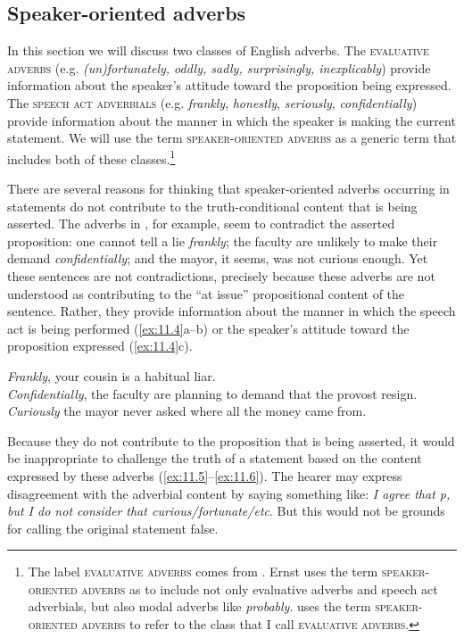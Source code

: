 \subsection{Speaker-oriented adverbs}\label{sec:11.2.2}

In this section we will discuss two classes of English adverbs. The \textsc{evaluative adverbs (}e.g. \textit{(un)fortunately, oddly, sadly, surprisingly, inexplicably}) provide information about the speaker’s attitude toward the proposition being expressed. The \textsc{speech act adverbials (}e.g. \textit{frankly}, \textit{honestly}, \textit{seriously}, \textit{confidentially}) provide information about the manner in which the speaker is making the current statement. We will use the term \textsc{speaker-oriented adverbs} as a generic term that includes both of these classes.\footnote{The label \textsc{evaluative adverbs} comes from \citet{Ernst2009}. Ernst uses the term \textsc{speaker-oriented adverbs} as to include not only evaluative adverbs and speech act adverbials, but also modal adverbs like \textit{probably}. \citet{Potts2005} uses the term \textsc{speaker-oriented adverbs} to refer to the class that I call \textsc{evaluative adverbs}.}



There are several reasons for thinking that speaker-oriented adverbs occurring in statements do not contribute to the truth-conditional content that is being asserted. The adverbs in , for example, seem to contradict the asserted proposition: one cannot tell a lie \textit{frankly}; the faculty are unlikely to make their demand \textit{confidentially}; and the mayor, it seems, was not curious enough. Yet these sentences are not contradictions, precisely because these adverbs are not understood as contributing to the “at issue” propositional content of the sentence. Rather, they provide information about the manner in which the speech act is being performed (\ref{ex:11.4}a--b) or the speaker’s attitude toward the proposition expressed (\ref{ex:11.4}c).


\ea \label{ex:11.4}
\ea \textit{Frankly}, your cousin is a habitual liar.\\
\ex \textit{Confidentially}, the faculty are planning to demand that the provost resign.\\
\ex \textit{Curiously} the mayor never asked where all the money came from.
                       \z
\z


Because they do not contribute to the proposition that is being asserted, it would be inappropriate to challenge the truth of a statement based on the content expressed by these adverbs (\ref{ex:11.5}--\ref{ex:11.6}). The hearer may express disagreement with the adverbial content by saying something like: \textit{I agree that p, but I do not consider that curious/fortunate/etc}. But this would not be grounds for calling the original statement false.


